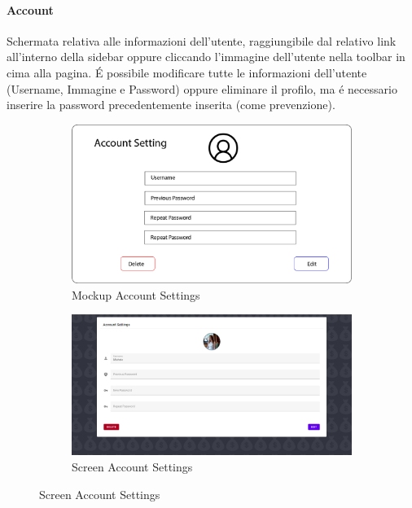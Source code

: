 \documentclass{report}
\begin{document}
\paragraph{Account}
Schermata relativa alle informazioni dell’utente, raggiungibile dal relativo link all’interno della sidebar oppure cliccando l’immagine dell’utente nella toolbar in cima alla pagina. É possibile modificare tutte le informazioni dell’utente (Username, Immagine e Password) oppure eliminare il profilo, ma é necessario inserire la password precedentemente inserita (come prevenzione).
\begin{figure}[H]
    \begin{subfigure}
        \centering
        \includegraphics[scale=0.3]{images/mockups/Account Settings.png}
        \caption{Mockup Account Settings}
    \end{subfigure}
    \par\bigskip
    \begin{subfigure}
        \centering
        \includegraphics[scale=0.35]{images/screens/Account Settings.png}
        \caption{Screen Account Settings}
    \end{subfigure}
\end{figure}
\end{document}

